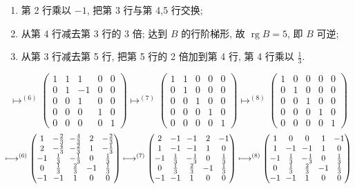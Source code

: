 \begin{enumerate}
\item[(3)] 第 2 行乘以 $-1$, 把第 3 行与第 4,5 行交换;
\item[(4)] 从第 4 行减去第 3 行的 3 倍; 达到 $B$ 的行阶梯形, 故 $\operatorname{rg} B = 5$, 即
$B$ 可逆;
\item[(5)] 从第 3 行减去第 5 行, 把第 5 行的 2 倍加到第 4 行, 第 4 行乘以 $\frac{1}{3}$.
\end{enumerate}
\[
\longmapsto^{(6)} \begin{pmatrix} 1 & 1 & 1 & 0 & 0 \\ 0 & 1 & -1 & 0 & 0 \\ 0 & 0 & 1 & 0 & 0 \\ 0 & 0 & 0 & 1 & 0 \\ 0 & 0 & 0 & 0 & 1 \end{pmatrix}
\longmapsto^{(7)} \begin{pmatrix} 1 & 1 & 0 & 0 & 0 \\ 0 & 1 & 0 & 0 & 0 \\ 0 & 0 & 1 & 0 & 0 \\ 0 & 0 & 0 & 1 & 0 \\ 0 & 0 & 0 & 0 & 1 \end{pmatrix}
\longmapsto^{(8)} \begin{pmatrix} 1 & 0 & 0 & 0 & 0 \\ 0 & 1 & 0 & 0 & 0 \\ 0 & 0 & 1 & 0 & 0 \\ 0 & 0 & 0 & 1 & 0 \\ 0 & 0 & 0 & 0 & 1 \end{pmatrix}
\]
\[
{\setlength{\arraycolsep}{3.2pt}
\longmapsto^{(6)} \begin{pmatrix} 1 & -\frac{2}{3} & -\frac{4}{3} & 2 & -\frac{2}{3} \\ 2 & -\frac{4}{3} & -\frac{2}{3} & 1 & -\frac{1}{3} \\ -1 & \frac{1}{3} & -\frac{1}{3} & 0 & \frac{1}{3} \\ 0 & \frac{1}{3} & \frac{2}{3} & -1 & \frac{1}{3} \\ -1 & -1 & 1 & 0 & 0 \end{pmatrix}
\longmapsto^{(7)} \begin{pmatrix} 2 & -1 & -1 & 2 & -1 \\ 1 & -1 & -1 & 1 & 0 \\ -1 & \frac{1}{3} & -\frac{1}{3} & 0 & \frac{1}{3} \\ 0 & \frac{1}{3} & \frac{2}{3} & -1 & \frac{1}{3} \\ -1 & -1 & 1 & 0 & 0 \end{pmatrix}
\longmapsto^{(8)} \begin{pmatrix} 1 & 0 & 0 & 1 & -1 \\ 1 & -1 & -1 & 1 & 0 \\ -1 & \frac{1}{3} & -\frac{1}{3} & 0 & \frac{1}{3} \\ 0 & \frac{1}{3} & \frac{2}{3} & -1 & \frac{1}{3} \\ -1 & -1 & 1 & 0 & 0 \end{pmatrix}
}
\]
